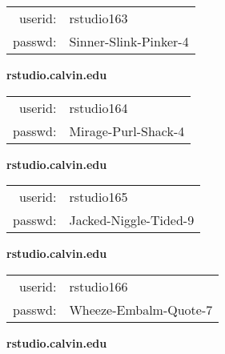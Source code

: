 \documentclass{article}\usepackage[]{graphicx}\usepackage[]{color}
\begin{document}
\begin{multicols}{3}
\begin{minipage}{.3\textwidth}
\begin{tabular}{rl}
userid: & rstudio163\\
passwd: & Sinner-Slink-Pinker-4

\vspace{5mm}

\end{tabular}\end{minipage}

\vspace{5mm}

\begin{minipage}{.3\textwidth}
\centerline{\textbf{rstudio.calvin.edu}}
\medskip
\begin{tabular}{rl}

userid: & rstudio164\\
passwd: & Mirage-Purl-Shack-4

\vspace{5mm}

\end{tabular}\end{minipage}

\vspace{5mm}

\begin{minipage}{.3\textwidth}
\centerline{\textbf{rstudio.calvin.edu}}
\medskip
\begin{tabular}{rl}

userid: & rstudio165\\
passwd: & Jacked-Niggle-Tided-9

\vspace{5mm}

\end{tabular}\end{minipage}

\vspace{5mm}

\begin{minipage}{.3\textwidth}
\centerline{\textbf{rstudio.calvin.edu}}
\medskip
\begin{tabular}{rl}

userid: & rstudio166\\
passwd: & Wheeze-Embalm-Quote-7

\vspace{5mm}

\end{tabular}\end{minipage}

\vspace{5mm}

\begin{minipage}{.3\textwidth}
\centerline{\textbf{rstudio.calvin.edu}}
\medskip
\begin{tabular}{rl}


\end{tabular}
\end{minipage}
\end{multicols}
\end{document}
